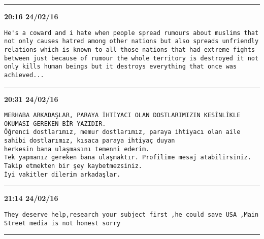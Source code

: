 \hrule%

\begin{adjustwidth}{0cm}{0cm}
\footnotesize \textbf{20:16 24/02/16}

\begin{lstlisting}[breaklines, breakatwhitespace, basicstyle=\small, frame=leftline]
He's a coward and i hate when people spread rumours about muslims that not only causes hatred among other nations but also spreads unfriendly relations which is known to all those nations that had extreme fights between just because of rumour the whole territory is destroyed it not only kills human beings but it destroys everything that once was achieved...
\end{lstlisting}
\end{adjustwidth}

\hrule%

\begin{adjustwidth}{0cm}{0cm}
\footnotesize \textbf{20:31 24/02/16}

\begin{lstlisting}[breaklines, breakatwhitespace, basicstyle=\small, frame=leftline]
MERHABA ARKADAŞLAR, PARAYA İHTİYACI OLAN DOSTLARIMIZIN KESİNLİKLE OKUMASI GEREKEN BİR YAZIDIR.
Öğrenci dostlarımız, memur dostlarımız, paraya ihtiyacı olan aile sahibi dostlarımız, kısaca paraya ihtiyaç duyan 
herkesin bana ulaşmasını temenni ederim.
Tek yapmanız gereken bana ulaşmaktır. Profilime mesaj atabilirsiniz. Takip etmekten bir şey kaybetmezsiniz. 
İyi vakitler dilerim arkadaşlar.
\end{lstlisting}
\end{adjustwidth}

\hrule%

\begin{adjustwidth}{0cm}{0cm}
\footnotesize \textbf{21:14 24/02/16}

\begin{lstlisting}[breaklines, breakatwhitespace, basicstyle=\small, frame=leftline]
They deserve help,research your subject first ,he could save USA ,Main Street media is not honest sorry
\end{lstlisting}
\end{adjustwidth}

\hrule%


